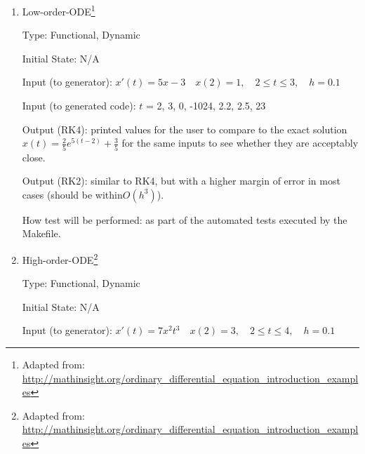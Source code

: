 \documentclass[12pt, titlepage]{article}
\begin{document}
\begin{enumerate}

\item{Low-order-ODE\footnote{Adapted from:
\url{http://mathinsight.org/ordinary_differential_equation_introduction_examples}}\\}

Type: Functional, Dynamic
					
Initial State: N/A
					
Input (to generator): $x'(t) = 5x - 3 \quad x(2) = 1, \quad 2 \leq t \leq 3, 
\quad 
h = 0.1$

Input (to generated code): $t$ = 2, 3, 0, -1024, 2.2, 2.5, 23 
					
Output (RK4): printed values for the user to compare to the exact solution 
$x(t) = \frac{2}{5} 
e^{5(t-2)} + \frac{3}{5}$ for the same inputs to see whether they are 
acceptably close.

Output (RK2): similar to RK4, but with a higher margin of error in most cases
(should be within$O(h^3)$).
					
How test will be performed: as part of the automated tests executed by the 
Makefile.


\item{High-order-ODE\footnote{Adapted from:
\url{http://mathinsight.org/ordinary_differential_equation_introduction_examples}}\\}

Type: Functional, Dynamic

Initial State: N/A

Input (to generator): $x'(t) = 7x^2t^3 \quad x(2) = 3, \quad 2 \leq t \leq 4, 
\quad h = 0.1$ 


\end{enumerate}
\end{document}
